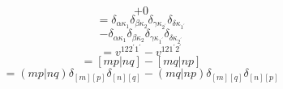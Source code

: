 \documentclass[12pt]{article}
\begin{document}
\begin{equation}
    +0
\end{equation}
\begin{equation}
    =\delta _{\alpha  \kappa _{1}}\delta _{\beta  \kappa _{2}}\delta _{\gamma  \kappa _{2^{\prime}}}\delta _{\delta  \kappa _{1^{\prime}}}
\end{equation}
\begin{equation}
    -\delta _{\alpha  \kappa _{1}}\delta _{\beta  \kappa _{2}}\delta _{\gamma  \kappa _{1^{\prime}}}\delta _{\delta  \kappa _{2^{\prime}}}
\end{equation}
\begin{equation}
    =v^{122^{\prime}1^{\prime}}-v^{121^{\prime}2^{\prime}}
\end{equation}
\begin{equation}
    =[mp|nq]-[mq|np]
\end{equation}
\begin{equation}
    =(mp|nq)\delta _{[m][p]}\delta _{[n][q]}-(mq|np)\delta _{[m][q]}\delta _{[n][p]}
\end{equation}

    
\end{document}
